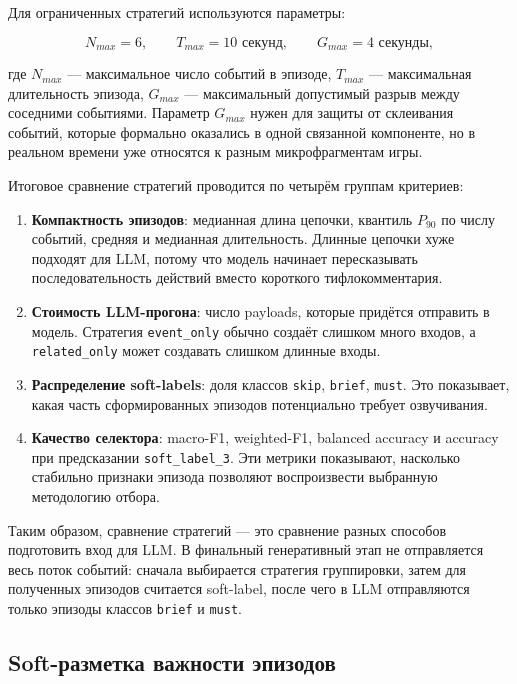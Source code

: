\documentclass[a4paper,14pt]{extarticle}
\numberwithin{table}{section}
\numberwithin{figure}{section}
\numberwithin{equation}{section}
\begin{document}
Для ограниченных стратегий используются параметры:

\begin{equation}
    N_{max}=6, \qquad T_{max}=10\text{ секунд}, \qquad G_{max}=4\text{ секунды},
\end{equation}

где $N_{max}$ --- максимальное число событий в эпизоде, $T_{max}$ --- максимальная длительность эпизода, $G_{max}$ --- максимальный допустимый разрыв между соседними событиями. Параметр $G_{max}$ нужен для защиты от склеивания событий, которые формально оказались в одной связанной компоненте, но в реальном времени уже относятся к разным микрофрагментам игры.

Итоговое сравнение стратегий проводится по четырём группам критериев:

\begin{enumerate}
    \item \textbf{Компактность эпизодов}: медианная длина цепочки, квантиль $P_{90}$ по числу событий, средняя и медианная длительность. Длинные цепочки хуже подходят для LLM, потому что модель начинает пересказывать последовательность действий вместо короткого тифлокомментария.
    \item \textbf{Стоимость LLM-прогона}: число payloads, которые придётся отправить в модель. Стратегия \texttt{event\_only} обычно создаёт слишком много входов, а \texttt{related\_only} может создавать слишком длинные входы.
    \item \textbf{Распределение soft-labels}: доля классов \texttt{skip}, \texttt{brief}, \texttt{must}. Это показывает, какая часть сформированных эпизодов потенциально требует озвучивания.
    \item \textbf{Качество селектора}: macro-F1, weighted-F1, balanced accuracy и accuracy при предсказании \texttt{soft\_label\_3}. Эти метрики показывают, насколько стабильно признаки эпизода позволяют воспроизвести выбранную методологию отбора.
\end{enumerate}

Таким образом, сравнение стратегий --- это сравнение разных способов подготовить вход для LLM. В финальный генеративный этап не отправляется весь поток событий: сначала выбирается стратегия группировки, затем для полученных эпизодов считается soft-label, после чего в LLM отправляются только эпизоды классов \texttt{brief} и \texttt{must}.

\subsection{Soft-разметка важности эпизодов}
\end{document}
